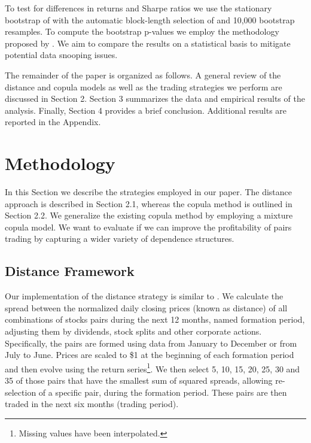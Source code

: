 \documentclass[a4paper]{article}
\begin{document}
	To test for differences in returns and Sharpe ratios we use the stationary bootstrap of \citet*{pr94} with the automatic block-length selection of \citet*{pw04} and 10,000 bootstrap resamples. To compute the bootstrap p-values we employ the methodology proposed by \citet*{lw08}. We aim to compare the results on a statistical basis to mitigate potential data snooping issues.
	
	The remainder of the paper is organized as follows. A general review of the distance and copula models as well as the trading strategies we perform are discussed in Section 2. Section 3 summarizes the data and empirical results of the analysis. Finally, Section 4 provides a brief conclusion. Additional results are reported in the Appendix.
	
	\vspace{0.6cm}
	
	\section{Methodology}
	
	In this Section we describe the strategies employed in our paper. The distance approach is described in Section 2.1, whereas the copula method is outlined in Section 2.2. We generalize the existing copula method by employing a mixture copula model. We want to evaluate if we can improve the profitability of pairs trading by capturing a wider variety of dependence structures. 
	
	\subsection{Distance Framework}
	
	Our implementation of the distance strategy is similar to \citet*{bv12}. We calculate the spread between the normalized daily closing prices (known as distance) of all combinations of stocks pairs during the next 12 months, named formation period, adjusting them by dividends, stock splits and other corporate actions. Specifically, the pairs are formed using data from January to December or from July to June. Prices are scaled to \$1 at the beginning of each formation period and then evolve using the return series\footnote{%
		Missing values have been interpolated.}.  We then select 5, 10, 15, 20, 25, 30 and 35 of those pairs that have the smallest sum of squared spreads, allowing re-selection of a specific pair, during the formation period. These pairs are then traded in the next six months (trading period).
	
\end{document}
